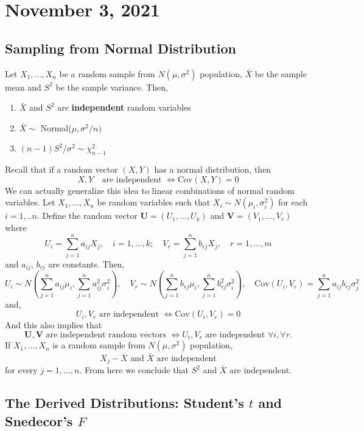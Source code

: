 \section{November 3, 2021}
\subsection{Sampling from Normal Distribution}
\begin{proposition}
    Let $X_1,...,X_n$ be a random sample from $N(\mu,\sigma^2)$ population, $\bar{X}$ be the sample mean and $S^2$ be the sample variance. Then, 
    \begin{enumerate}
        \item $\bar{X}$ and $S^2$ are \textbf{independent} random variables
        \item $\bar{X} \sim$ Normal($\mu,\sigma^2/n)$
        \item $(n-1)S^2/\sigma^2 \sim \chi_{n-1}^2$
    \end{enumerate}
\end{proposition}
Recall that if a random vector $(X,Y)$ has a normal distribution, then
$$
X,Y \quad \text{are independent } \iff \text{Cov}(X,Y) = 0
$$
We can actually generalize this idea to linear combinations of normal random variables. Let $X_1,...,X_n$ be random variables such that $X_i \sim N(\mu_i, \sigma_i^2)$ for each $i=1,..n$. Define the random vector $\boldsymbol{U} =(U_1,...,U_k)$ and $\boldsymbol{V} = (V_1,...,V_r)$ where
$$
U_i = \sum_{j=1}^n a_{ij}X_j, \quad i=1,...,k; \quad V_r = \sum_{j=1}^{n}b_{rj}X_j, \quad r=1,...,m
$$
and $ a_{ij}$, $b_{rj}$ are constants. Then,
$$
U_i \sim N \left( \sum_{j=1}^n a_{ij} \mu_i, \sum_{j=1}^n a_{ij}^2 \sigma_i^2 \right),
\quad
V_r \sim N \left( \sum_{j=1}^n b_{rj} \mu_i, \sum_{j=1}^n b_{rj}^2 \sigma_i^2 \right),
\quad
\text{Cov}(U_i,V_r) = \sum_{j=1}^n a_{ij} b_{rj} \sigma_j^2
$$
and, 
$$
U_i,V_r \text{ are independent } \iff \text{Cov}(U_i,V_r) = 0
$$
And this also implies that
$$
\boldsymbol{U},\boldsymbol{V} \text{ are independent random vectors } \iff U_i, V_r \text{ are independent } \forall i, \forall r.
$$
 If $X_1,...,X_n$ is a random sample from $N(\mu, \sigma^2)$ population, 
$$
X_j - \bar{X} \text{ and } \bar{X} \text{ are independent}
$$
for every $j=1,...,n$. From here we conclude that $S^2$ and $\bar{X}$ are independent. 

\subsection{The Derived Distributions: Student’s $t$ and Snedecor’s $F$}